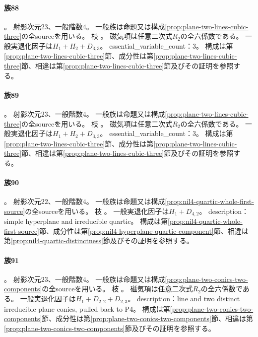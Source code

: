 \paragraph{族88}\label{catalogue:R4_PLANE_TWO_LINES_CUBIC_NODE_FLEX_SECANT_23}
。
射影次元$23$、一般階数$4$。
一般族は命題又は構成\ref{prop:plane-two-lines-cubic-three}の全sourceを用いる。
枝 。
磁気項は任意二次式$R_2$の全六係数である。
一般実退化因子は$H_{1}+H_{2}+D_{3,3}$。
essential\_variable\_count：3。
構成は第\ref{prop:plane-two-lines-cubic-three}節、成分性は第\ref{prop:plane-two-lines-cubic-three}節、相違は第\ref{prop:plane-two-lines-cubic-three}節及びその証明を参照する。

\paragraph{族89}\label{catalogue:R4_PLANE_TWO_LINES_CUBIC_CUSP_TANGENT_CUSP_THIRD_SECANT_23}
。
射影次元$23$、一般階数$4$。
一般族は命題又は構成\ref{prop:plane-two-lines-cubic-three}の全sourceを用いる。
枝 。
磁気項は任意二次式$R_2$の全六係数である。
一般実退化因子は$H_{1}+H_{2}+D_{3,3}$。
essential\_variable\_count：3。
構成は第\ref{prop:plane-two-lines-cubic-three}節、成分性は第\ref{prop:plane-two-lines-cubic-three}節、相違は第\ref{prop:plane-two-lines-cubic-three}節及びその証明を参照する。

\paragraph{族90}\label{catalogue:R4_NIL4_HYPERPLANE_QUARTIC_22}
。
射影次元$22$、一般階数$4$。
一般族は命題又は構成\ref{prop:nil4-quartic-whole-first-source}の全sourceを用いる。
枝 。
一般実退化因子は$H_{1}+D_{4,2}$。
description：simple hyperplane and irreducible quartic。
構成は第\ref{prop:nil4-quartic-whole-first-source}節、成分性は第\ref{prop:nil4-hyperplane-quartic-component}節、相違は第\ref{prop:nil4-quartic-distinctness}節及びその証明を参照する。

\paragraph{族91}\label{catalogue:R4_PLANE_TWO_CONICS_BITANGENT_23}
。
射影次元$23$、一般階数$4$。
一般族は命題又は構成\ref{prop:plane-two-conics-two-components}の全sourceを用いる。
枝 。
磁気項は任意二次式$R_2$の全六係数である。
一般実退化因子は$H_{1}+D_{2,2}+D_{2,3}$。
description：line and two distinct irreducible plane conics, pulled back to P4。
構成は第\ref{prop:plane-two-conics-two-components}節、成分性は第\ref{prop:plane-two-conics-two-components}節、相違は第\ref{prop:plane-two-conics-two-components}節及びその証明を参照する。

